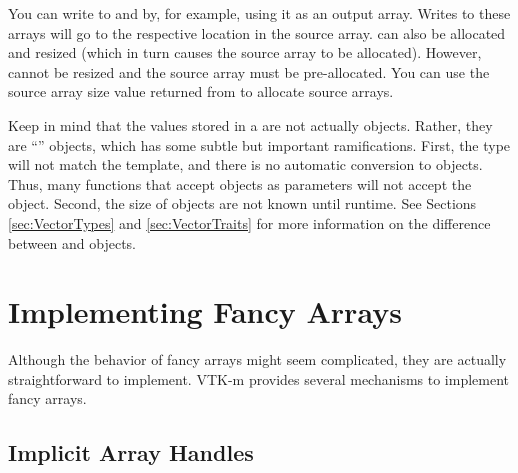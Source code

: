 
\begin{didyouknow}
  You can write to  and  by, for example, using it as an output array.
  Writes to these arrays will go to the respective location in the source array.
   can also be allocated and resized (which in turn causes the source array to be allocated).
  However,  cannot be resized and the source array must be pre-allocated.
  You can use the source array size value returned from  to allocate source arrays.
\end{didyouknow}

\begin{commonerrors}
  Keep in mind that the values stored in a  are not actually  objects.
  Rather, they are ``\Veclike'' objects, which has some subtle but important ramifications.
  First, the type will not match the  template, and there is no automatic conversion to  objects.
  Thus, many functions that accept  objects as parameters will not accept the \Veclike object.
  Second, the size of \Veclike objects are not known until runtime.
  See Sections \ref{sec:VectorTypes} and \ref{sec:VectorTraits} for more information on the difference between  and \Veclike objects.
\end{commonerrors}



\section{Implementing Fancy Arrays}
\label{sec:ImplementingFancyArrays}

Although the behavior of fancy arrays might seem complicated, they are
actually straightforward to implement. VTK-m provides several mechanisms to
implement fancy arrays.

\subsection{Implicit Array Handles}


